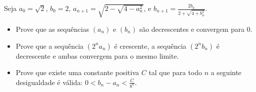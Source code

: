 Seja \(a_{0}=\sqrt{2}\), \(b_{0}=2\), \(a_{n+1}=\sqrt{2-\sqrt{4-a_{n}^{2}}}\), e \(b_{n+1}=\frac{2b_{n}}{2+\sqrt{4+b_{n}^{2}}}\).
\begin{itemize}
\item[(a)] Prove que as sequências \((a_{n})\) e \((b_{n})\) são decrescentes e convergem para \(0\).
\item[(b)] Prove que a sequência \((2^{n}a_{n})\) é crescente, a sequência \((2^{n}b_{n})\) é decrescente e ambas convergem para o mesmo limite.
\item[(c)] Prove que existe uma constante positiva \(C\) tal que para todo \(n\) a seguinte desigualdade é válida: \(0 <b_{n}-a_{n} <\frac{C}{8^{n}}\).
\end{itemize}
